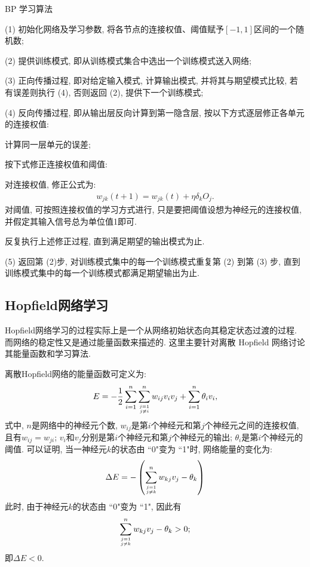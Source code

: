 BP 学习算法
\begin{center}
\begin{minipage}{0.8\textwidth}
 (1) 初始化网络及学习参数, 将各节点的连接权值、阈值赋予$[-1, 1]$区间的一个随机数;

 (2) 提供训练模式, 即从训练模式集合中选出一个训练模式送入网络;

 (3) 正向传播过程, 即对给定输入模式, 计算输出模式, 并将其与期望模式比较, 若有误差则执行 (4), 否则返回 (2), 提供下一个训练模式;

 (4) 反向传播过程, 即从输出层反向计算到第一隐含层, 按以下方式逐层修正各单元的连接权值:

    \quad {} 计算同一层单元的误差;

    \quad {} 按下式修正连接权值和阈值:

    \qquad 对连接权值, 修正公式为:
        \begin{align}
            w_{j k} (t+1)=w_{j k} (t)+\eta \delta_{k} O_{j}.
        \end{align}
    对阈值, 可按照连接权值的学习方式进行, 只是要把阈值设想为神经元的连接权值, 并假定其输入信号总为单位值1即可.

     反复执行上述修正过程, 直到满足期望的输出模式为止.

 (5) 返回第 (2)步, 对训练模式集中的每一个训练模式重复第 (2) 到第 (3) 步, 直到训练模式集中的每一个训练模式都满足期望输出为止.
\end{minipage}
\end{center}
\subsection{Hopfield网络学习}
Hopfield网络学习的过程实际上是一个从网络初始状态向其稳定状态过渡的过程. 而网络的稳定性又是通过能量函数来描述的. 这里主要针对离散 Hopfield 网络讨论其能量函数和学习算法.

离散Hopfield网络的能量函数可定义为:
\begin{align}
    E=-\frac{1}{2} \sum_{i=1}^{n} \sum_{j=1 \atop j \neq i}^{n} w_{i j} v_{i} v_{j}+\sum_{i=1}^{n} \theta_{i} v_{i},
\end{align}
式中, $n$是网络中的神经元个数, $w_{ij}$是第$i$个神经元和第$j$个神经元之间的连接权值, 且有$w_{ij}=w_{ji}$; $v_i$和$v_j$分别是第$i$个神经元和第$j$个神经元的输出; $\theta_i$是第$i$个神经元的阈值.
可以证明, 当一神经元$k$的状态由 ``0"变为 ``1"时, 网络能量的变化为:
\begin{align}
    \Delta E=-\left (\sum_{j=1 \atop j \neq k}^{n} w_{k j} v_{j}-\theta_{k}\right)
\end{align}
此时, 由于神经元$k$的状态由 ``0"变为 ``1", 因此有
\begin{align}
    \sum_{j=1 \atop j \neq k}^{n} w_{k j} v_{j}-\theta_{k}>0;
\end{align}
即$\Delta E<0$.

